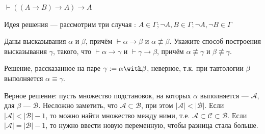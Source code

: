 \begin{exercise}[4.e]
    \(\vdash ((A \to B) \to A) \to A\)

    Идея решения --- рассмотрим три случая : \(A \in \Gamma; \neg A, B \in \Gamma; \neg A, \neg B \in \Gamma\)
\end{exercise}

\begin{exercise}[5]
    Даны высказывания $\alpha$ и $\beta$, причём $\vdash \alpha\rightarrow\beta$ и $\alpha\not\equiv\beta$.
    Укажите способ построения высказывания $\gamma$, такого, что
    $\vdash\alpha\rightarrow\gamma$ и $\vdash\gamma\rightarrow\beta$, причём $\alpha\not\equiv\gamma$ и
    $\beta\not\equiv\gamma$.

    Решение, рассказанное на паре \(\gamma : = \alpha \with \beta\), неверное, т.к. при тавтологии \(\beta\) выполняется \(\alpha \equiv \gamma\).

    Верное решение: пусть множество подстановок, на которых \(\alpha\) выполняется --- \(\mathcal{A}\), для \(\beta\) --- \(\mathcal{B}\). Несложно заметить, что \(\mathcal{A}\subset \mathcal{B}\), при этом \(|\mathcal{A}| < |\mathcal{B}|\). Если \(|\mathcal{A}| < |\mathcal{B}| - 1\), то можно найти множество между ними, т.е. \(\mathcal{A}\subset \mathcal{C}\subset \mathcal{B}\). Если \(|\mathcal{A}| = |\mathcal{B}| - 1\), то нужно ввести новую переменную, чтобы разница стала больше.
\end{exercise}

